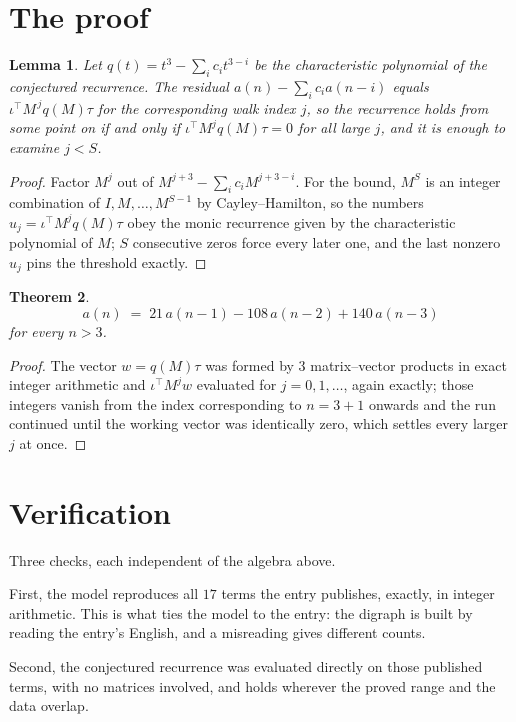 \documentclass[11pt,a4paper]{article}
\theoremstyle{plain}
\newtheorem{theorem}{Theorem}
\newtheorem{lemma}[theorem]{Lemma}
\theoremstyle{definition}
\begin{document}
\section{The proof}

\begin{lemma}\label{lem:crit}
Let $q(t)=t^{3}-\sum_i c_it^{3-i}$ be the characteristic polynomial of the
conjectured recurrence. The residual $a(n)-\sum_ic_ia(n-i)$ equals
$\iota^{\!\top}M^{\,j}q(M)\tau$ for the corresponding walk index $j$, so the recurrence
holds from some point on if and only if $\iota^{\!\top}M^{j}q(M)\tau=0$ for all large $j$,
and it is enough to examine $j<S$.
\end{lemma}

\begin{proof}
Factor $M^{j}$ out of $M^{j+3}-\sum_ic_iM^{j+3-i}$. For the bound, $M^{S}$
is an integer combination of $I,M,\dots,M^{S-1}$ by Cayley--Hamilton, so the numbers
$u_j=\iota^{\!\top}M^{j}q(M)\tau$ obey the monic recurrence given by the characteristic
polynomial of $M$; $S$ consecutive zeros force every later one, and the last nonzero $u_j$
pins the threshold exactly.
\end{proof}

\begin{theorem}
\[
a(n)\;=\;21\,a(n-1) - 108\,a(n-2) + 140\,a(n-3)
\]
for every $n>3$.
\end{theorem}

\begin{proof}
The vector $w=q(M)\tau$ was formed by $3$ matrix--vector products in exact integer
arithmetic and $\iota^{\!\top}M^{j}w$ evaluated for $j=0,1,\dots$, again exactly; those
integers vanish from the index corresponding to $n=3+1$ onwards and the run continued
until the working vector was identically zero, which settles every larger $j$ at once.
\end{proof}

\section{Verification}

Three checks, each independent of the algebra above.

First, the model reproduces all $17$ terms the entry publishes, exactly, in integer
arithmetic. This is what ties the model to the entry: the digraph is built by reading the
entry's English, and a misreading gives different counts.

Second, the conjectured recurrence was evaluated directly on those published terms, with no
matrices involved, and holds wherever the proved range and the data overlap.
\end{document}

